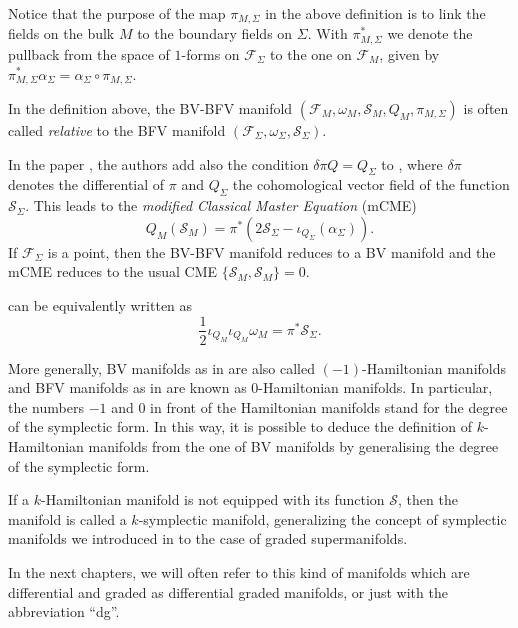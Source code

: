 Notice that the purpose of the map $\pi_{M, \Sigma}$ in the above definition is to link the fields on the bulk $M$ to the boundary fields on $\Sigma$.
With $\pi_{M,\Sigma}^*$ we denote the pullback from the space of $1$-forms on $\mathcal{F}_\Sigma$ to the one on $\mathcal{F}_M$, given by $\pi_{M,\Sigma}^* \alpha_\Sigma = \alpha_\Sigma \circ \pi_{M,\Sigma}$.

In the definition above, the BV-BFV manifold $(\mathcal{F}_M, \omega_M, \mathcal{S}_M, Q_M, \pi_{M, \Sigma})$ is often called \emph{relative} to the BFV manifold $(\mathcal{F}_\Sigma, \omega_\Sigma, \mathcal{S}_\Sigma)$.

In the paper \cite{mCME}, the authors add also the condition $\delta \pi Q = Q_\Sigma$ to , where $\delta \pi$ denotes the differential of $\pi$ and $Q_\Sigma$ the cohomological vector field of the function $\mathcal{S}_\Sigma$.
This leads to the \emph{modified Classical Master Equation} (mCME)
\begin{equation}
\label{eq:mCME}
    Q_M (\mathcal{S}_M) = \pi ^* (2 \mathcal{S}_\Sigma - \iota_{Q_\Sigma}(\alpha_\Sigma)).
\end{equation}
If $\mathcal{F}_\Sigma$ is a point, then the BV-BFV manifold reduces to a BV manifold and the mCME reduces to the usual CME $\{\mathcal{S}_M, \mathcal{S}_M\} = 0$.

 can be equivalently written as
\begin{equation*}
    \frac{1}{2} \iota_{Q_M} \iota_{Q_M} \omega_M =  \pi^* \mathcal{S}_\Sigma .
\end{equation*}

More generally, BV manifolds as in  are also called $(-1)$-Hamiltonian manifolds and BFV manifolds as in  are known as $0$-Hamiltonian manifolds.
In particular, the numbers $-1$ and $0$ in front of the Hamiltonian manifolds stand for the degree of the symplectic form.
In this way, it is possible to deduce the definition of $k$-Hamiltonian manifolds from the one of BV manifolds by generalising the degree of the symplectic form.

If a $k$-Hamiltonian manifold is not equipped with its function $\mathcal{S}$, then the manifold is called a $k$-symplectic manifold, generalizing the concept of symplectic manifolds we introduced in  to the case of graded supermanifolds.

In the next chapters, we will often refer to this kind of manifolds which are differential and graded as differential graded manifolds, or just with the abbreviation “dg”.